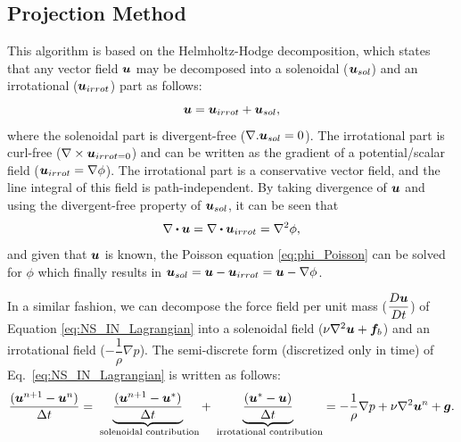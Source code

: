 \subsection{Projection Method}
This algorithm is based on the Helmholtz-Hodge decomposition, which states that any vector field $\boldsymbol{u}$ may be decomposed into a  solenoidal ($\boldsymbol{u}_{sol}$) and an irrotational ($\boldsymbol{u}_{irrot}$) part as follows:
\begin{equation}
\boldsymbol{u}=\boldsymbol{u}_{irrot}+\boldsymbol{u}_{sol},
\end{equation}
where the solenoidal part is divergent-free ($\nabla. \boldsymbol{u}_{sol}=0$). The irrotational part is curl-free ($\nabla \times \boldsymbol{u}_{irrot=0}$) and can be written as the gradient of a potential/scalar field ($\boldsymbol{u}_{irrot}=\nabla \phi$). The irrotational part is a conservative vector field, and the line integral of this field is path-independent.   
By taking divergence of $\boldsymbol{u}$ and using the divergent-free property of $\boldsymbol{u}_{sol}$, it can be seen that 
\begin{equation}\label{eq:phi_Poisson}
\nabla \bigcdot  \vect{u}=\nabla \bigcdot \vect{u}_{irrot}= \nabla^2 \phi,
\end{equation}
and given that $\boldsymbol{u}$ is known, the Poisson equation \ref{eq:phi_Poisson} can be solved for $\phi$ which finally results in $\boldsymbol{u}_{sol}=\boldsymbol{u} -\boldsymbol{u}_{irrot}=\boldsymbol{u}-\nabla \phi$.

In a similar fashion, we can decompose the force field per unit mass ($\dfrac{D{\boldsymbol{u}}}{Dt}$)  of Equation \ref{eq:NS_IN_Lagrangian} into a solenoidal field ($ \nu \nabla^{2} {\boldsymbol{u}}+{\boldsymbol{f}_b}$) and an irrotational field ($-\dfrac{1}{\rho} \nabla p$). The semi-discrete form (discretized only in time) of Eq.~\ref{eq:NS_IN_Lagrangian} is written as follows:
\begin{equation}
\dfrac{(\boldsymbol{u}^{n+1}-\boldsymbol{u}^n)}{\Delta t}= 
\underbrace{\dfrac{(\boldsymbol{u}^{n+1}-\boldsymbol{u}^*)}{\Delta t}}_{ \text{  solenoidal contribution}} 
+
\underbrace{\dfrac{(\boldsymbol{u}^{*}-\boldsymbol{u})}{\Delta t}}_{\text{ irrotational contribution}} = -\dfrac{1}{\rho} \nabla p +\nu \nabla^2\boldsymbol{u}^n + \boldsymbol{g}.
\end{equation}

